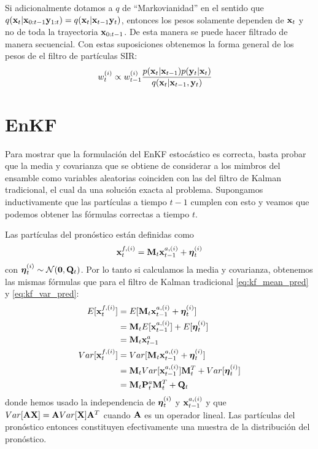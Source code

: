 Si adicionalmente dotamos a $q$ de ``Markovianidad'' en el sentido que $q(\mathbf{x}_t | \mathbf{x}_{0:t-1} \mathbf{y}_{1:t}) = q(\mathbf{x}_t | \mathbf{x}_{t-1} \mathbf{y}_t)$, entonces los pesos solamente dependen de $\mathbf{x}_t$ y no de toda la trayectoria $\mathbf{x}_{0:t-1}$. De esta manera se puede hacer filtrado de manera secuencial. Con estas suposiciones obtenemos la forma general de los pesos de el filtro de partículas SIR:
\begin{align*}
    w_t^{(i)} &\propto w_{t-1}^{(i)} \frac{p(\mathbf{x}_t | \mathbf{x}_{t-1}) p(\mathbf{y}_t | \mathbf{x}_t)}{q(\mathbf{x}_t | \mathbf{x}_{t-1}, \mathbf{y}_t)}
\end{align*}

\section{EnKF} \label{appendix:enkf}

Para mostrar que la formulación del EnKF estocástico es correcta, basta probar que la media y covarianza que se obtiene de considerar a los mimbros del ensamble como variables aleatorias coinciden con las del filtro de Kalman tradicional, el cual da una solución exacta al problema. Supongamos inductivamente que las partículas a tiempo $t-1$ cumplen con esto y veamos que podemos obtener las fórmulas correctas a tiempo $t$.

Las partículas del pronóstico están definidas como 
$$ \mathbf{x}_t^{f, (i)} = \mathbf{M}_t \mathbf{x}_{t-1}^{a, (i)} + \mbox{\boldmath$ \eta $}_t^{(i)}$$
con $\mbox{\boldmath$ \eta $}_t^{(i)} \sim \mathcal{N}(\mathbf{0}, \mathbf{Q}_t)$. Por lo tanto si calculamos la media y covarianza, obtenemos las mismas fórmulas que para el filtro de Kalman tradicional \ref{eq:kf_mean_pred} y \ref{eq:kf_var_pred}:
\begin{align*}
    E[\mathbf{x}_t^{f, (i)}] &= E[\mathbf{M}_t \mathbf{x}_{t-1}^{a, (i)} + \mbox{\boldmath$ \eta $}_t^{(i)}] \\
    &= \mathbf{M}_t E[\mathbf{x}_{t-1}^{a, (i)}] + E[\mbox{\boldmath$ \eta $}_t^{(i)}] \\
    &= \mathbf{M}_t \mathbf{x}_{t-1}^a \\
    Var[\mathbf{x}_t^{f, (i)}] &= Var[\mathbf{M}_t \mathbf{x}_{t-1}^{a, (i)} + \mbox{\boldmath$ \eta $}_t^{(i)}] \\
    &= \mathbf{M}_t Var[\mathbf{x}_{t-1}^{a, (i)}] \mathbf{M}_t^T + Var[\mbox{\boldmath$ \eta $}_t^{(i)}] \\
    &= \mathbf{M}_t \mathbf{P}_t^a \mathbf{M}_t^T + \mathbf{Q}_t 
\end{align*}
donde hemos usado la independencia de $\mbox{\boldmath$ \eta $}_t^{(i)}$ y $\mathbf{x}_{t-1}^{a, (i)}$ y que $Var[\mathbf{A} \mathbf{X}] = \mathbf{A} Var[\mathbf{X}] \mathbf{A}^T$ cuando $\mathbf{A}$ es un operador lineal. Las partículas del pronóstico entonces constituyen efectivamente una muestra de la distribución del pronóstico.

